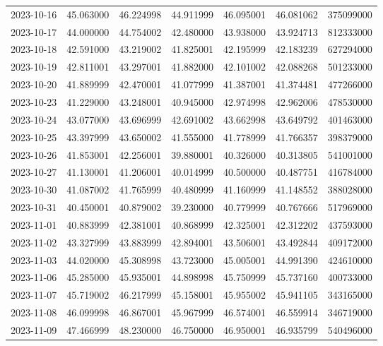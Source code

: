 \begin{tabular}{lrrrrrr}
2023-10-16 &   45.063000 &   46.224998 &   44.911999 &   46.095001 &   46.081062 &   375099000 \\
2023-10-17 &   44.000000 &   44.754002 &   42.480000 &   43.938000 &   43.924713 &   812333000 \\
2023-10-18 &   42.591000 &   43.219002 &   41.825001 &   42.195999 &   42.183239 &   627294000 \\
2023-10-19 &   42.811001 &   43.297001 &   41.882000 &   42.101002 &   42.088268 &   501233000 \\
2023-10-20 &   41.889999 &   42.470001 &   41.077999 &   41.387001 &   41.374481 &   477266000 \\
2023-10-23 &   41.229000 &   43.248001 &   40.945000 &   42.974998 &   42.962006 &   478530000 \\
2023-10-24 &   43.077000 &   43.696999 &   42.691002 &   43.662998 &   43.649792 &   401463000 \\
2023-10-25 &   43.397999 &   43.650002 &   41.555000 &   41.778999 &   41.766357 &   398379000 \\
2023-10-26 &   41.853001 &   42.256001 &   39.880001 &   40.326000 &   40.313805 &   541001000 \\
2023-10-27 &   41.130001 &   41.206001 &   40.014999 &   40.500000 &   40.487751 &   416784000 \\
2023-10-30 &   41.087002 &   41.765999 &   40.480999 &   41.160999 &   41.148552 &   388028000 \\
2023-10-31 &   40.450001 &   40.879002 &   39.230000 &   40.779999 &   40.767666 &   517969000 \\
2023-11-01 &   40.883999 &   42.381001 &   40.868999 &   42.325001 &   42.312202 &   437593000 \\
2023-11-02 &   43.327999 &   43.883999 &   42.894001 &   43.506001 &   43.492844 &   409172000 \\
2023-11-03 &   44.020000 &   45.308998 &   43.723000 &   45.005001 &   44.991390 &   424610000 \\
2023-11-06 &   45.285000 &   45.935001 &   44.898998 &   45.750999 &   45.737160 &   400733000 \\
2023-11-07 &   45.719002 &   46.217999 &   45.158001 &   45.955002 &   45.941105 &   343165000 \\
2023-11-08 &   46.099998 &   46.867001 &   45.967999 &   46.574001 &   46.559914 &   346719000 \\
2023-11-09 &   47.466999 &   48.230000 &   46.750000 &   46.950001 &   46.935799 &   540496000 \\

\end{tabular}
